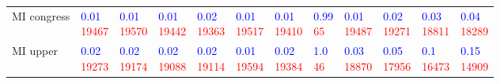 \begin{tabular}{llllllllllll}
MI congress &  \makecell{\textcolor{blue}{0.01} \\ \textcolor{red}{19467}} &  \makecell{\textcolor{blue}{0.01} \\ \textcolor{red}{19570}} &  \makecell{\textcolor{blue}{0.01} \\ \textcolor{red}{19442}} &  \makecell{\textcolor{blue}{0.02} \\ \textcolor{red}{19363}} &  \makecell{\textcolor{blue}{0.01} \\ \textcolor{red}{19517}} &  \makecell{\textcolor{blue}{0.01} \\ \textcolor{red}{19410}} &   \makecell{\textcolor{blue}{0.99} \\ \textcolor{red}{65}} &  \makecell{\textcolor{blue}{0.01} \\ \textcolor{red}{19487}} &  \makecell{\textcolor{blue}{0.02} \\ \textcolor{red}{19271}} &  \makecell{\textcolor{blue}{0.03} \\ \textcolor{red}{18811}} &  \makecell{\textcolor{blue}{0.04} \\ \textcolor{red}{18289}} \\
MI upper    &  \makecell{\textcolor{blue}{0.02} \\ \textcolor{red}{19273}} &  \makecell{\textcolor{blue}{0.02} \\ \textcolor{red}{19174}} &  \makecell{\textcolor{blue}{0.02} \\ \textcolor{red}{19088}} &  \makecell{\textcolor{blue}{0.02} \\ \textcolor{red}{19114}} &  \makecell{\textcolor{blue}{0.01} \\ \textcolor{red}{19594}} &  \makecell{\textcolor{blue}{0.02} \\ \textcolor{red}{19384}} &    \makecell{\textcolor{blue}{1.0} \\ \textcolor{red}{46}} &  \makecell{\textcolor{blue}{0.03} \\ \textcolor{red}{18870}} &  \makecell{\textcolor{blue}{0.05} \\ \textcolor{red}{17956}} &   \makecell{\textcolor{blue}{0.1} \\ \textcolor{red}{16473}} &  \makecell{\textcolor{blue}{0.15} \\ \textcolor{red}{14909}} \\

\end{tabular}
